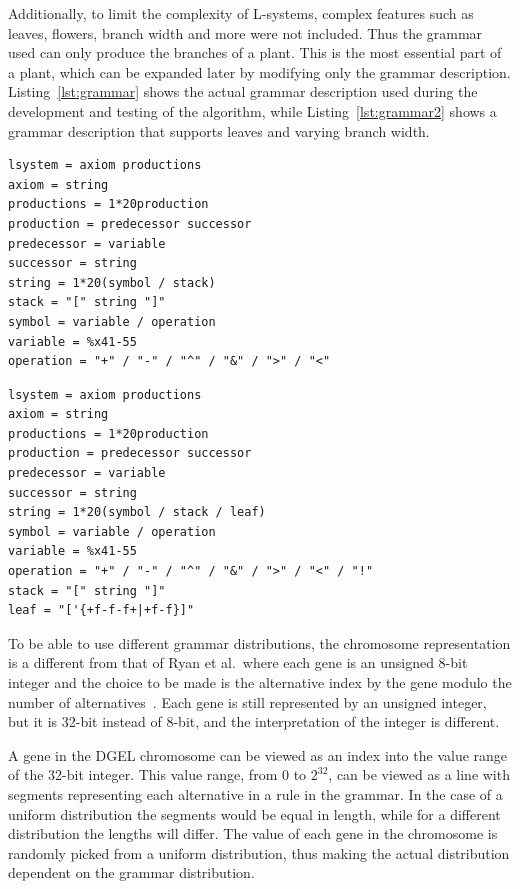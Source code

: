 Additionally, to limit the complexity of L-systems, complex features such as leaves, flowers, branch width and more were not included.
Thus the grammar used can only produce the branches of a plant.
This is the most essential part of a plant, which can be expanded later by modifying only the grammar description.
Listing~\ref{lst:grammar} shows the actual grammar description used during the development and testing of the algorithm, while Listing~\ref{lst:grammar2} shows a grammar description that supports leaves and varying branch width.

\begin{lstlisting}[caption=ABNF grammar description used in DGEL, label=lst:grammar, float]
lsystem = axiom productions
axiom = string
productions = 1*20production
production = predecessor successor
predecessor = variable
successor = string
string = 1*20(symbol / stack)
stack = "[" string "]"
symbol = variable / operation
variable = %x41-55
operation = "+" / "-" / "^" / "&" / ">" / "<"
\end{lstlisting}

\begin{lstlisting}[caption=ABNF grammar description supporting leaves and varying branch width, label=lst:grammar2, float]
lsystem = axiom productions
axiom = string
productions = 1*20production
production = predecessor successor
predecessor = variable
successor = string
string = 1*20(symbol / stack / leaf)
symbol = variable / operation
variable = %x41-55
operation = "+" / "-" / "^" / "&" / ">" / "<" / "!"
stack = "[" string "]"
leaf = "['{+f-f-f+|+f-f}]"
\end{lstlisting}

To be able to use different grammar distributions, the chromosome representation is a different from that of Ryan et al.\ where each gene is an unsigned 8-bit integer and the choice to be made is the alternative index by the gene modulo the number of alternatives~\cite{1998Ryan}.
Each gene is still represented by an unsigned integer, but it is 32-bit instead of 8-bit, and the interpretation of the integer is different.

A gene in the DGEL chromosome can be viewed as an index into the value range of the 32-bit integer.
This value range, from $0$ to $2^{32}$, can be viewed as a line with segments representing each alternative in a rule in the grammar.
In the case of a uniform distribution the segments would be equal in length, while for a different distribution the lengths will differ.
The value of each gene in the chromosome is randomly picked from a uniform distribution, thus making the actual distribution dependent on the grammar distribution.

